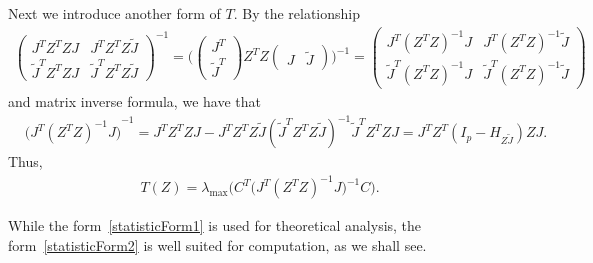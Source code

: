 \documentclass[review]{elsarticle}
\theoremstyle{plain}
\theoremstyle{definition}
\theoremstyle{remark}
\begin{document}
Next we introduce another form of $T$.
By the relationship
\begin{equation*}
    \begin{aligned}
        \begin{pmatrix}
            J^T Z^T ZJ & J^T Z^T Z\tilde{J}\\
            \tilde{J}^T Z^T ZJ & \tilde{J}^T Z^T Z \tilde{J}
        \end{pmatrix}^{-1}
        =
        \Big(
        \begin{pmatrix}
            J^T\\
            \tilde{J}^T
        \end{pmatrix}
        Z^T Z
        \begin{pmatrix}
            J&\tilde{J}
        \end{pmatrix}
        \Big)^{-1}
        =
        \begin{pmatrix}
            J^T {(Z^T Z)}^{-1}J & J^T {(Z^T Z)}^{-1}\tilde{J}\\
            \tilde{J}^T {(Z^T Z)}^{-1}J & \tilde{J}^T {(Z^T Z)}^{-1} \tilde{J}
        \end{pmatrix}
    \end{aligned}
\end{equation*}
and matrix inverse formula, we have that
\begin{equation*}
    \begin{aligned}
        &{\big( J^T {(Z^T Z)}^{-1}J \big)}^{-1}
        =J^T Z^T ZJ - J^T Z^T Z\tilde{J}{(\tilde{J}^T Z^T Z \tilde{J})}^{-1}
            \tilde{J}^T Z^T ZJ 
        = J^T Z^T( I_p- H_{Z\tilde{J}}) ZJ.
    \end{aligned}
\end{equation*}
Thus, 
\begin{equation}\label{statisticForm2}
    \begin{aligned}
        T(Z)=
        \lambda_{\max}\Big(C^T\big( J^T (Z^T Z)^{-1}J \big)^{-1}C\Big).
    \end{aligned}
\end{equation}

While the form~\eqref{statisticForm1} is used for theoretical analysis, the form~\eqref{statisticForm2} is well suited for computation, as we shall see.
\end{document}
